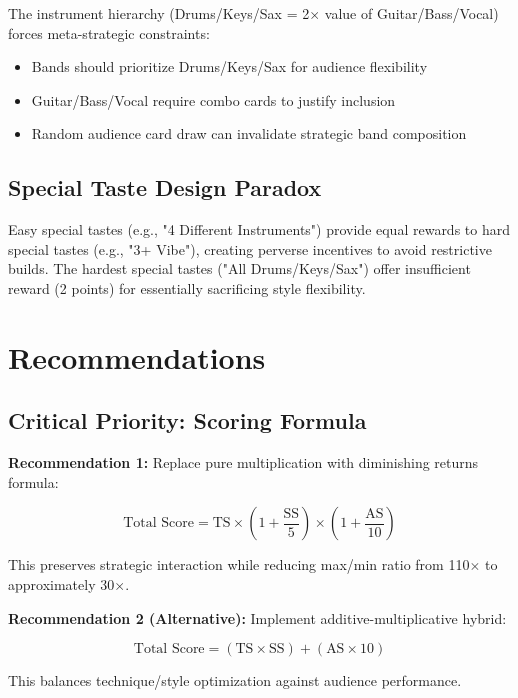 \documentclass[11pt,a4paper]{article}
\begin{document}
The instrument hierarchy (Drums/Keys/Sax = 2$\times$ value of Guitar/Bass/Vocal) forces meta-strategic constraints:
\begin{itemize}
    \item Bands should prioritize Drums/Keys/Sax for audience flexibility
    \item Guitar/Bass/Vocal require combo cards to justify inclusion
    \item Random audience card draw can invalidate strategic band composition
\end{itemize}

\subsection{Special Taste Design Paradox}

Easy special tastes (e.g., "4 Different Instruments") provide equal rewards to hard special tastes (e.g., "3+ Vibe"), creating perverse incentives to avoid restrictive builds. The hardest special tastes ("All Drums/Keys/Sax") offer insufficient reward (2 points) for essentially sacrificing style flexibility.

\section{Recommendations}

\subsection{Critical Priority: Scoring Formula}

\textbf{Recommendation 1:} Replace pure multiplication with diminishing returns formula:

\begin{equation}
\text{Total Score} = \text{TS} \times \left(1 + \frac{\text{SS}}{5}\right) \times \left(1 + \frac{\text{AS}}{10}\right)
\end{equation}

This preserves strategic interaction while reducing max/min ratio from 110$\times$ to approximately 30$\times$.

\textbf{Recommendation 2 (Alternative):} Implement additive-multiplicative hybrid:

\begin{equation}
\text{Total Score} = (\text{TS} \times \text{SS}) + (\text{AS} \times 10)
\end{equation}

This balances technique/style optimization against audience performance.
\end{document}

